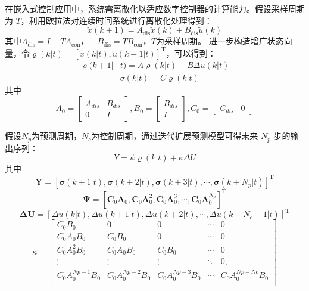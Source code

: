 \documentclass[lang=chs, degree=master, blindreview=false, winfonts=true]{yanputhesis}
\begin{document}
在嵌入式控制应用中，系统需离散化以适应数字控制器的计算能力。假设采样周期为 $T$，利用欧拉法对连续时间系统进行离散化处理得到：
\begin{equation}
	\tilde{x}(k+1) = A_\text{dis} \tilde{x}(k) + B_\text{dis} \tilde{u}(k)
\end{equation}
其中$	A_\text{dis} = I + T A_\text{con}$，$ \quad B_\text{dis} = T B_\text{con}$，$T$为采样周期。
进一步构造增广状态向量，令$\varrho(k|t)=\left[\tilde{x}(k|t),\tilde{u}(k-1|t)\right]^\mathrm{T}$，可以得到：
\begin{equation}
	\begin{aligned}\varrho(k+1|&t)=A\varrho(k|t)+B\Delta u(k|t)\\&\sigma(k|t)=C\varrho(k|t)\end{aligned}
\end{equation}
其中
$$A_0=\begin{bmatrix}A_{dis}&B_{dis}\\0&I\end{bmatrix},B_0=\begin{bmatrix}B_{dis}\\I\end{bmatrix},C_0=\begin{bmatrix}C_{dis}&0\end{bmatrix}$$

假设$N_p$为预测周期，$N_c$为控制周期，通过迭代扩展预测模型可得未来 $N_p$ 步的输出序列：
\begin{equation}
	Y=\psi\varrho(k|t)+\kappa\Delta U
\end{equation}
其中$$
\boldsymbol{Y} = 
\left[
	\boldsymbol{\sigma}(k+1|t) , \boldsymbol{\sigma}(k+2|t) , \boldsymbol{\sigma}(k+3|t) , \cdots , \boldsymbol{\sigma}(k+N_p|t)
\right]^\mathrm{T}$$
$$\boldsymbol{\Psi} = 
\left[
	\boldsymbol{C}_0\boldsymbol{A}_0 , \boldsymbol{C}_0\boldsymbol{A}_0^2 , \boldsymbol{C}_0\boldsymbol{A}_0^3 , \cdots , \boldsymbol{C}_0\boldsymbol{A}_0^{N_p}
\right]^\mathrm{T}$$
$$\boldsymbol{\Delta U} = 
\left[
	\Delta u(k|t) , \Delta u(k+1|t) , \Delta u(k+2|t) , \cdots , \Delta u(k+N_c-1|t)
\right]^\mathrm{T}$$
$$\left.\kappa=\left[\begin{array}{ccccc}{C_{0}B_{0}}&{0}&{0}&{\cdots}&{0}\\{C_{0}A_{0}B_{0}}&{C_{0}B_{0}}&{0}&{\cdots}&{0}\\{C_{0}A_{0}^{2}B_{0}}&{C_{0}A_{0}B_{0}}&{C_{0}B_{0}}&{\cdots}&{0}\\{\vdots}&{\vdots}&{\vdots}&{\ddots}&{0,}\\{C_{0}A_{0}^{Np-1}B_{0}}&{C_{0}A_{0}^{Np-2}B_{0}}&{C_{0}A_{0}^{Np-3}B_{0}}&{\cdots}&{C_{0}A_{0}^{Np-Nc}B_{0}}\\\end{array}\right.\right]$$
\end{document}
